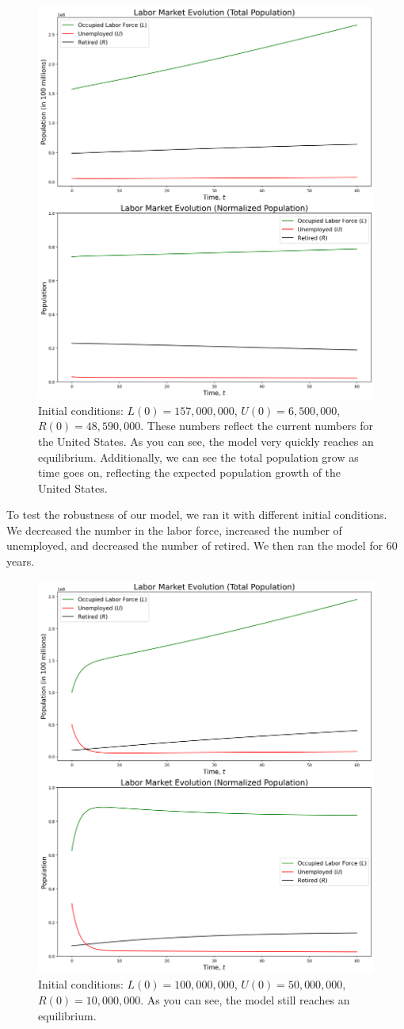 \documentclass{article}
\begin{document}
\begin{figure}[h]
    \centering
    \includegraphics[width=.5\textwidth]{figures/results_lur_1.png}
    \caption{Initial conditions: $L(0) = 157,000,000$, $U(0) = 6,500,000$, $R(0) = 48,590,000$. These
             numbers reflect the current numbers for the United States. As you can see, the model very quickly
             reaches an equilibrium. Additionally, we can see the total population grow as time goes on, reflecting
             the expected population growth of the United States.}
    \label{fig:results_lur_1}
\end{figure}

To test the robustness of our model, we ran it with different initial conditions. We decreased the number in the labor force, increased the number of 
unemployed, and decreased the number of retired. We then ran the model for 60 years.

\begin{figure}[h]
    \centering
    \includegraphics[width=.5\textwidth]{figures/results_lur_2.png}
    \caption{Initial conditions: $L(0) = 100,000,000$, $U(0) = 50,000,000$, $R(0) = 10,000,000$. As you can see, the model still reaches an equilibrium.}
    \label{fig:results_lur_1}
\end{figure}
\end{document}
